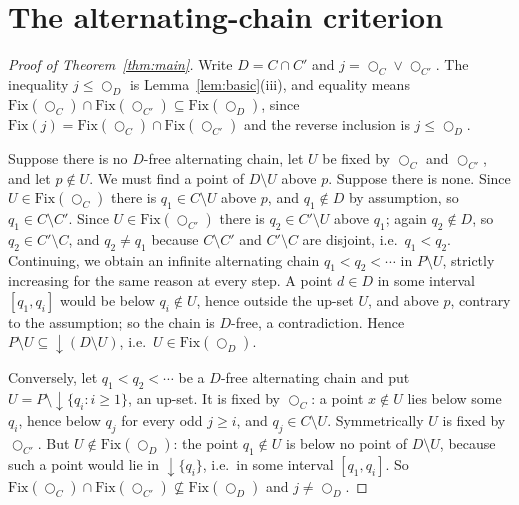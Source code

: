 \documentclass[11pt]{amsart}
\theoremstyle{definition}
\newcommand{\Fix}{\mathrm{Fix}}
\newcommand{\lax}{\bigcirc}
\newcommand{\dn}{{\downarrow}}
\begin{document}
\section{The alternating-chain criterion}\label{sec:chain}

\begin{proof}[Proof of Theorem~\ref{thm:main}]
Write $D=C\cap C'$ and $j=\lax_C\vee\lax_{C'}$. The inequality $j\le\lax_D$ is
Lemma~\ref{lem:basic}(iii), and equality means
$\Fix(\lax_C)\cap\Fix(\lax_{C'})\subseteq\Fix(\lax_D)$, since
$\Fix(j)=\Fix(\lax_C)\cap\Fix(\lax_{C'})$ and the reverse inclusion is
$j\le\lax_D$.

Suppose there is no $D$-free alternating chain, let $U$ be fixed by $\lax_C$
and $\lax_{C'}$, and let $p\notin U$. We must find a point of $D\setminus U$
above $p$. Suppose there is none. Since $U\in\Fix(\lax_C)$ there is
$q_1\in C\setminus U$ above $p$, and $q_1\notin D$ by assumption, so
$q_1\in C\setminus C'$. Since $U\in\Fix(\lax_{C'})$ there is
$q_2\in C'\setminus U$ above $q_1$; again $q_2\notin D$, so $q_2\in C'\setminus
C$, and $q_2\ne q_1$ because $C\setminus C'$ and $C'\setminus C$ are
disjoint, i.e.\ $q_1<q_2$. Continuing, we obtain an infinite alternating
chain $q_1<q_2<\cdots$ in $P\setminus U$, strictly increasing for the same
reason at every step. A point $d\in D$ in some
interval $[q_1,q_i]$ would be below $q_i\notin U$, hence outside the up-set
$U$, and above $p$, contrary to the assumption; so the chain is $D$-free, a
contradiction. Hence $P\setminus U\subseteq\dn(D\setminus U)$, i.e.\
$U\in\Fix(\lax_D)$.

Conversely, let $q_1<q_2<\cdots$ be a $D$-free alternating chain and put
$U=P\setminus\dn\{q_i:i\ge1\}$, an up-set. It is fixed by $\lax_C$: a point
$x\notin U$ lies below some $q_i$, hence below $q_j$ for every odd $j\ge i$,
and $q_j\in C\setminus U$. Symmetrically $U$ is fixed by $\lax_{C'}$. But
$U\notin\Fix(\lax_D)$: the point $q_1\notin U$ is below no point of
$D\setminus U$, because such a point would lie in $\dn\{q_i\}$, i.e.\ in some
interval $[q_1,q_i]$. So $\Fix(\lax_C)\cap\Fix(\lax_{C'})\not\subseteq
\Fix(\lax_D)$ and $j\ne\lax_D$.
\end{proof}
\end{document}
